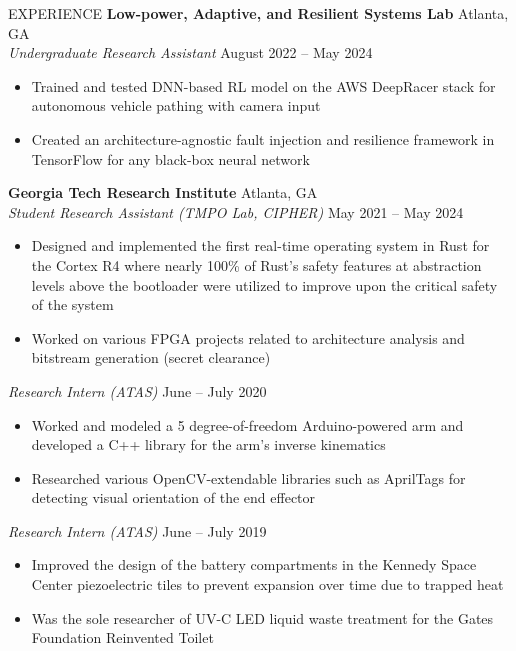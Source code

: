 \documentclass{resume} %
\begin{document}
\vspace{-0.8em}
\begin{rSection}{EXPERIENCE}
\textbf{Low-power, Adaptive, and Resilient Systems Lab} \hfill Atlanta, GA\\
\textit{Undergraduate Research Assistant} \hfill August 2022 -- May 2024
\vspace{-0.5em}
   \begin{itemize}
      \itemsep -5pt {} 
      \item Trained and tested DNN-based RL model on the AWS DeepRacer stack for autonomous vehicle pathing with camera input
      \item Created an architecture-agnostic fault injection and resilience framework in TensorFlow
      for any black-box neural network
   \end{itemize}
\vspace{-0.5em}
\textbf{Georgia Tech Research Institute} \hfill Atlanta, GA\\
\textit{Student Research Assistant (TMPO Lab, CIPHER)} \hfill May 2021 -- May 2024
\vspace{-0.5em}
 \begin{itemize}
    \itemsep -5pt {} 
     \item Designed and implemented the first real-time operating system in Rust for the Cortex R4 where
     nearly 100\% of Rust's safety features at abstraction levels above the bootloader were utilized to improve
     upon the critical safety of the system
     \item Worked on various FPGA projects related to architecture analysis and bitstream generation (secret clearance)
 \end{itemize}
\vspace{-0.5em}
\textit{Research Intern (ATAS)} \hfill June -- July 2020
\vspace{-0.5em}
 \begin{itemize}
    \itemsep -5pt {} 
     \item Worked and modeled a 5 degree-of-freedom Arduino-powered arm and
     developed a C++ library for the arm's inverse kinematics
     \item Researched various OpenCV-extendable libraries such as AprilTags for detecting visual orientation of the end effector
 \end{itemize}
\vspace{-0.5em}
\textit{Research Intern (ATAS)} \hfill June -- July 2019
\vspace{-0.5em}
 \begin{itemize}
    \itemsep -5pt {} 
     \item Improved the design of the battery compartments in the Kennedy Space Center piezoelectric tiles
     to prevent expansion over time due to trapped heat
     \item Was the sole researcher of UV-C LED liquid waste treatment for the Gates Foundation
     Reinvented Toilet
 \end{itemize}
\end{rSection} 
\end{document}
